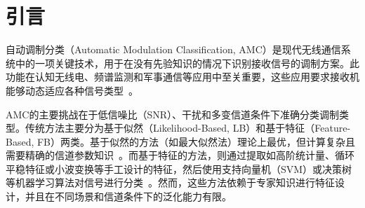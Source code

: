 \documentclass[conference]{IEEEtran}
\begin{document}






\section{引言}
自动调制分类（Automatic Modulation Classification, AMC）是现代无线通信系统中的一项关键技术，用于在没有先验知识的情况下识别接收信号的调制方案。此功能在认知无线电、频谱监测和军事通信等应用中至关重要，这些应用要求接收机能够动态适应各种信号类型~\cite{dobre2007survey}。

AMC的主要挑战在于低信噪比（SNR）、干扰和多变信道条件下准确分类调制类型。传统方法主要分为基于似然（Likelihood-Based, LB）和基于特征（Feature-Based, FB）两类。基于似然的方法（如最大似然法）理论上最优，但计算复杂且需要精确的信道参数知识~\cite{hameed2009likelihood}。而基于特征的方法，则通过提取如高阶统计量、循环平稳特征或小波变换等手工设计的特征，然后使用支持向量机（SVM）或决策树等机器学习算法对信号进行分类~\cite{hazza2013overview}。然而，这些方法依赖于专家知识进行特征设计，并且在不同场景和信道条件下的泛化能力有限。
\end{document}
